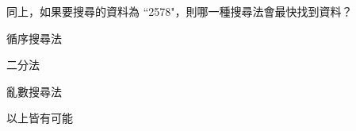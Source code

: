 \ifx\ntpcNinetyTwo\undefined[92學年基北區] \fi
同上，如果要搜尋的資料為 ``2578"，則哪一種搜尋法會最快找到資料？
  \begin{optionlist}
  \item 循序搜尋法
  \item 二分法
  \item 亂數搜尋法
  \item 以上皆有可能\label{ntpc-92-a12}
  \end{optionlist}